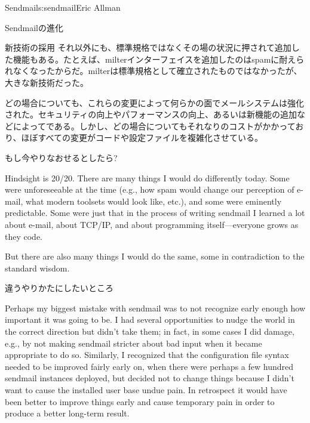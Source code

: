 \begin{aosachapter}{Sendmail}{s:sendmail}{Eric Allman}
\begin{aosasect1}{Sendmailの進化}
\begin{aosasect2}{新技術の採用}
それ以外にも、標準規格ではなくその場の状況に押されて追加した機能もある。たとえば、milterインターフェイスを追加したのはspamに耐えられなくなったからだ。milterは標準規格として確立されたものではなかったが、大きな新技術だった。

どの場合についても、これらの変更によって何らかの面でメールシステムは強化された。セキュリティの向上やパフォーマンスの向上、あるいは新機能の追加などによってである。しかし、どの場合についてもそれなりのコストがかかっており、ほぼすべての変更がコードや設定ファイルを複雑化させている。

\end{aosasect2}

\end{aosasect1}

\begin{aosasect1}{もし今やりなおせるとしたら?}

Hindsight is 20/20. There are many things I would do differently
today.  Some were unforeseeable at the time (e.g., how spam would
change our perception of e-mail, what modern toolsets would look like,
etc.), and some were eminently predictable. Some were just that in the
process of writing sendmail I learned a lot about e-mail, about TCP/IP,
and about programming itself---everyone grows as they code.

But there are also many things I would do the same, some in
contradiction to the standard wisdom.

\begin{aosasect2}{違うやりかたにしたいところ}

Perhaps my biggest mistake with sendmail was to not recognize early
enough how important it was going to be. I had several opportunities
to nudge the world in the correct direction but didn't take them; in
fact, in some cases I did damage, e.g., by not making sendmail
stricter about bad input when it became appropriate to do
so. Similarly, I recognized that the configuration file syntax needed
to be improved fairly early on, when there were perhaps a few hundred
sendmail instances deployed, but decided not to change things because
I didn't want to cause the installed user base undue pain. In
retrospect it would have been better to improve things early and
cause temporary pain in order to produce a better long-term result.


\end{aosasect2}
\end{aosasect1}
\end{aosachapter}
